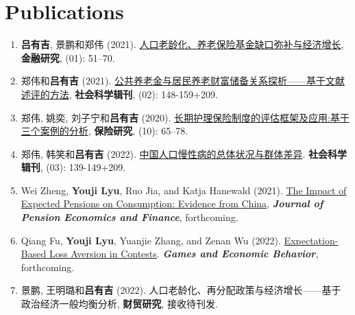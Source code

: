 \documentclass[a4paper,20pt]{article}
\begin{document}
\section{Publications}
\begin{enumerate}
  \item \textbf{吕有吉}, 景鹏和郑伟 (2021).  \href{https://kns.cnki.net/kcms/detail/detail.aspx?dbcode=CJFD&dbname=CJFDLAST2021&filename=JRYJ202101004&uniplatform=NZKPT&v=Dy2OTtraPRwQBCNyQyyTfnk0pDvMj5hhMOrx1D6UguBzHuWxZzM4m7wqNcS1S9Cj}{人口老龄化、养老保险基金缺口弥补与经济增长}, \textbf{金融研究}, (01): 51–70.
  \item 郑伟和\textbf{吕有吉} (2021).  \href{https://kns.cnki.net/kcms/detail/detail.aspx?dbcode=CJFD&dbname=CJFDLAST2021&filename=SHKK202102016&uniplatform=NZKPT&v=XHHYwOpyyL2LmGNfm4OqWUAI7PPKseUGo8kLctKSGNXjKnSWsIeHpDh5bFVReUc7}{公共养老金与居民养老财富储备关系探析——基于文献述评的方法}, \textbf{社会科学辑刊}, (02): 148-159+209.
  \item 郑伟, 姚奕, 刘子宁和\textbf{吕有吉} (2020).  \href{https://kns.cnki.net/kcms/detail/detail.aspx?dbcode=CJFD&dbname=CJFDLAST2020&filename=BXYJ202010005&uniplatform=NZKPT&v=R1BvzEknGiQEYRr62O-g_1rC0GBkkaLXc5MIXtpWArutUkiN9S3x3l5M5n-8pXL5}{长期护理保险制度的评估框架及应用:基于三个案例的分析}, \textbf{保险研究}, (10): 65–78.
  \item 郑伟, 韩笑和\textbf{吕有吉} (2022).  \href{https://kns.cnki.net/kcms/detail/detail.aspx?dbcode=CJFD&dbname=CJFDLAST2022&filename=SHKK202203015&uniplatform=NZKPT&v=OLFhN3uqd1sfiFgZUvlGr5bQOAWDN9kS2W_dWwzcS1LAX-0VsD0fJJWxyM41i7g8}{中国人口慢性病的总体状况与群体差异}. \textbf{社会科学辑刊}, (03): 139-149+209.
  \item Wei Zheng, \textbf{Youji Lyu}, Ruo Jia, and Katja Hanewald (2021). \href{https://www.cambridge.org/core/journals/journal-of-pension-economics-and-finance/article/abs/impact-of-expected-pensions-on-consumption-evidence-from-china/C765559B9ED1E8D1B1118C21514C59C5#}{The Impact of Expected Pensions on Consumption: Evidence from China}, \emph{\textbf{Journal of Pension Economics and Finance}}, forthcoming.
  \item Qiang Fu, \textbf{Youji Lyu}, Yuanjie Zhang, and Zenan Wu (2022). \href{https://www.sciencedirect.com/science/article/abs/pii/S0899825622000240}{Expectation-Based Loss Aversion in Contests}. \textbf{\emph{Games and Economic Behavior}}, forthcoming.
  \item 景鹏, 王明璐和\textbf{吕有吉} (2022). 人口老龄化、再分配政策与经济增长——基于政治经济一般均衡分析, \textbf{财贸研究}, 接收待刊发.
\end{enumerate}
\end{document}
